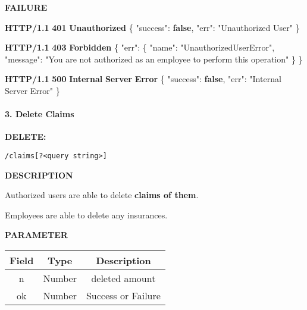 \documentclass[
]{article}
\newenvironment{Shaded}{}{}
\newcommand{\DataTypeTok}[1]{\textcolor[rgb]{0.56,0.13,0.00}{#1}}
\newcommand{\ErrorTok}[1]{\textcolor[rgb]{1.00,0.00,0.00}{\textbf{#1}}}
\newcommand{\FunctionTok}[1]{\textcolor[rgb]{0.02,0.16,0.49}{#1}}
\newcommand{\KeywordTok}[1]{\textcolor[rgb]{0.00,0.44,0.13}{\textbf{#1}}}
\newcommand{\StringTok}[1]{\textcolor[rgb]{0.25,0.44,0.63}{#1}}
\begin{document}
\textbf{FAILURE}

\begin{Shaded}
\begin{Highlighting}[]
\ErrorTok{HTTP/1.1} \ErrorTok{401} \ErrorTok{Unauthorized}
\FunctionTok{\{}
    \DataTypeTok{"success"}\FunctionTok{:} \KeywordTok{false}\FunctionTok{,}
    \DataTypeTok{"err"}\FunctionTok{:} \StringTok{"Unauthorized User"}
\FunctionTok{\}}
\end{Highlighting}
\end{Shaded}

\begin{Shaded}
\begin{Highlighting}[]
\ErrorTok{HTTP/1.1} \ErrorTok{403} \ErrorTok{Forbidden}
\FunctionTok{\{}
    \DataTypeTok{"err"}\FunctionTok{:} \FunctionTok{\{}
        \DataTypeTok{"name"}\FunctionTok{:} \StringTok{"UnauthorizedUserError"}\FunctionTok{,}
        \DataTypeTok{"message"}\FunctionTok{:} \StringTok{"You are not authorized as an employee to perform this operation"}
    \FunctionTok{\}}
\FunctionTok{\}}
\end{Highlighting}
\end{Shaded}

\begin{Shaded}
\begin{Highlighting}[]
\ErrorTok{HTTP/1.1} \ErrorTok{500} \ErrorTok{Internal} \ErrorTok{Server} \ErrorTok{Error}
\FunctionTok{\{}
    \DataTypeTok{"success"}\FunctionTok{:} \KeywordTok{false}\FunctionTok{,}
    \DataTypeTok{"err"}\FunctionTok{:} \StringTok{"Internal Server Error"}
\FunctionTok{\}}
\end{Highlighting}
\end{Shaded}

\hypertarget{header-n892}{%
\paragraph{3. Delete Claims}\label{header-n892}}

\textbf{DELETE:}

\begin{verbatim}
/claims[?<query string>]
\end{verbatim}

\textbf{DESCRIPTION}

Authorized users are able to delete \textbf{claims of them}.

Employees are able to delete any insurances.

\textbf{PARAMETER}

\begin{longtable}[]{@{}ccc@{}}
\toprule
Field & Type & Description\tabularnewline
\midrule
\endhead
n & Number & deleted amount\tabularnewline
ok & Number & Success or Failure\tabularnewline
\bottomrule
\end{longtable}
\end{document}
